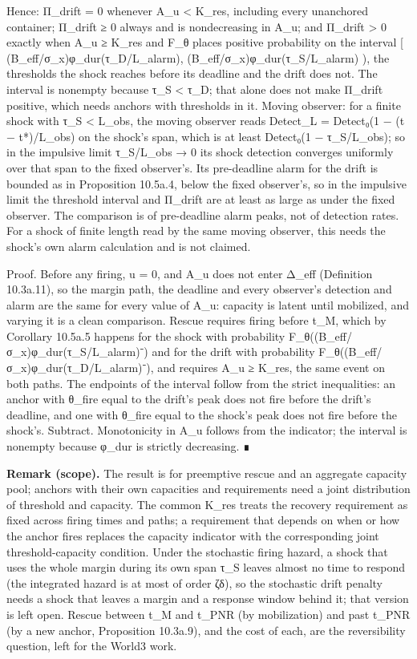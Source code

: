 \documentclass[
]{article}
\begin{document}
Hence: Π\_drift = 0 whenever A\_u \textless{} K\_res, including every
unanchored container; Π\_drift ≥ 0 always and is nondecreasing in A\_u;
and Π\_drift \textgreater{} 0 exactly when A\_u ≥ K\_res and F\_θ places
positive probability on the interval {[}
(B\_eff/σ\_x)φ\_dur(τ\_D/L\_alarm), (B\_eff/σ\_x)φ\_dur(τ\_S/L\_alarm)
), the thresholds the shock reaches before its deadline and the drift
does not. The interval is nonempty because τ\_S \textless{} τ\_D; that
alone does not make Π\_drift positive, which needs anchors with
thresholds in it. Moving observer: for a finite shock with τ\_S
\textless{} L\_obs, the moving observer reads Detect\_L = Detect₀(1 − (t
− t*)/L\_obs) on the shock's span, which is at least Detect₀(1 −
τ\_S/L\_obs); so in the impulsive limit τ\_S/L\_obs → 0 its shock
detection converges uniformly over that span to the fixed observer's.
Its pre-deadline alarm for the drift is bounded as in Proposition
10.5a.4, below the fixed observer's, so in the impulsive limit the
threshold interval and Π\_drift are at least as large as under the fixed
observer. The comparison is of pre-deadline alarm peaks, not of
detection rates. For a shock of finite length read by the same moving
observer, this needs the shock's own alarm calculation and is not
claimed.

Proof. Before any firing, u = 0, and A\_u does not enter Δ\_eff
(Definition 10.3a.11), so the margin path, the deadline and every
observer's detection and alarm are the same for every value of A\_u:
capacity is latent until mobilized, and varying it is a clean
comparison. Rescue requires firing before t\_M, which by Corollary
10.5a.5 happens for the shock with probability
F\_θ((B\_eff/σ\_x)φ\_dur(τ\_S/L\_alarm)⁻) and for the drift with
probability F\_θ((B\_eff/σ\_x)φ\_dur(τ\_D/L\_alarm)⁻), and requires A\_u
≥ K\_res, the same event on both paths. The endpoints of the interval
follow from the strict inequalities: an anchor with θ\_fire equal to the
drift's peak does not fire before the drift's deadline, and one with
θ\_fire equal to the shock's peak does not fire before the shock's.
Subtract. Monotonicity in A\_u follows from the indicator; the interval
is nonempty because φ\_dur is strictly decreasing. ∎

\textbf{Remark (scope).} The result is for preemptive rescue and an
aggregate capacity pool; anchors with their own capacities and
requirements need a joint distribution of threshold and capacity. The
common K\_res treats the recovery requirement as fixed across firing
times and paths; a requirement that depends on when or how the anchor
fires replaces the capacity indicator with the corresponding joint
threshold-capacity condition. Under the stochastic firing hazard, a
shock that uses the whole margin during its own span τ\_S leaves almost
no time to respond (the integrated hazard is at most of order ζδ), so
the stochastic drift penalty needs a shock that leaves a margin and a
response window behind it; that version is left open. Rescue between
t\_M and t\_PNR (by mobilization) and past t\_PNR (by a new anchor,
Proposition 10.3a.9), and the cost of each, are the reversibility
question, left for the World3 work.
\end{document}
